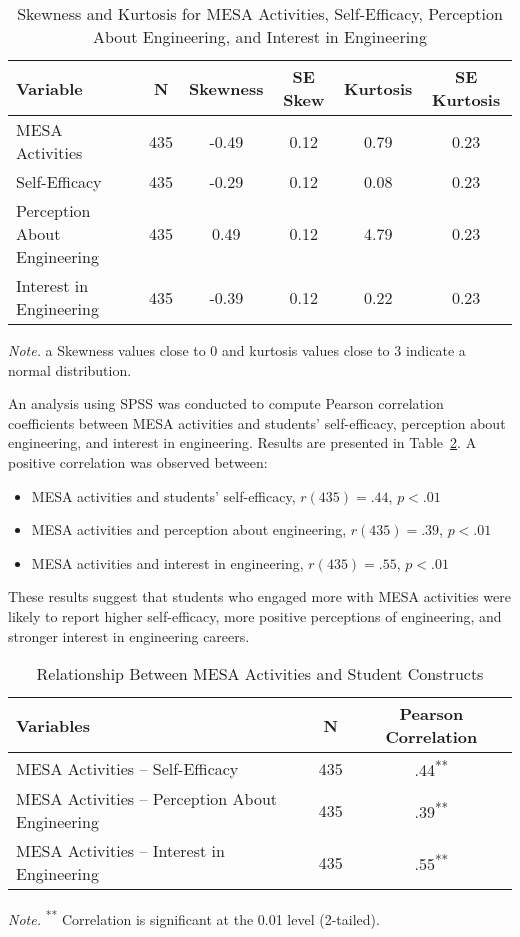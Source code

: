 \documentclass[11pt]{article}
\begin{document}
\begin{table}[h]
\centering
\caption{Skewness and Kurtosis for MESA Activities, Self-Efficacy, Perception About Engineering, and Interest in Engineering}
\label{tab:skew_kurt}
\begin{tabular}{lccccc}
\hline
\textbf{Variable} & \textbf{N} & \textbf{Skewness} & \textbf{SE Skew} & \textbf{Kurtosis} & \textbf{SE Kurtosis} \\
\hline
MESA Activities & 435 & -0.49 & 0.12 & 0.79 & 0.23 \\
Self-Efficacy & 435 & -0.29 & 0.12 & 0.08 & 0.23 \\
Perception About Engineering & 435 & 0.49 & 0.12 & 4.79 & 0.23 \\
Interest in Engineering & 435 & -0.39 & 0.12 & 0.22 & 0.23 \\
\hline
\end{tabular}
\begin{flushleft}
\textit{Note.} a Skewness values close to 0 and kurtosis values close to 3 indicate a normal distribution.
\end{flushleft}
\end{table}
An analysis using SPSS was conducted to compute Pearson correlation coefficients between MESA activities and students’ self-efficacy, perception about engineering, and interest in engineering. Results are presented in Table~\ref{tab:correlations}. A positive correlation was observed between:

\begin{itemize}
    \item MESA activities and students’ self-efficacy, $r(435) = .44$, $p < .01$
    \item MESA activities and perception about engineering, $r(435) = .39$, $p < .01$
    \item MESA activities and interest in engineering, $r(435) = .55$, $p < .01$
\end{itemize}

These results suggest that students who engaged more with MESA activities were likely to report higher self-efficacy, more positive perceptions of engineering, and stronger interest in engineering careers.

\begin{table}[h]
\centering
\begin{tabular}{lcc}
\hline
\textbf{Variables} & \textbf{N} & \textbf{Pearson Correlation} \\
\hline
MESA Activities – Self-Efficacy & 435 & .44\textsuperscript{**} \\
MESA Activities – Perception About Engineering & 435 & .39\textsuperscript{**} \\
MESA Activities – Interest in Engineering & 435 & .55\textsuperscript{**} \\
\hline
\end{tabular}
\caption{Relationship Between MESA Activities and Student Constructs}
\label{tab:correlations}
\begin{flushleft}
\textit{Note.} \textsuperscript{**} Correlation is significant at the 0.01 level (2-tailed).
\end{flushleft}
\end{table}
\end{document}
